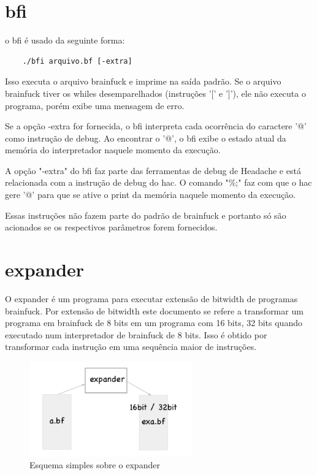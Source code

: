 \section{bfi}

o bfi é usado da seguinte forma:

\begin{verbatim}
    ./bfi arquivo.bf [-extra]
\end{verbatim}

Isso executa o arquivo brainfuck e imprime na saída padrão. Se o arquivo brainfuck tiver os whiles desemparelhados (instruções '[' e ']'), ele não executa o programa, porém exibe uma mensagem de erro. 

Se a opção -extra for fornecida, o bfi interpreta cada ocorrência do caractere '@' como instrução de debug. Ao encontrar o '@', o bfi exibe o estado atual da memória do interpretador naquele momento da execução. 

A opção "-extra" do bfi faz parte das ferramentas de debug de Headache e está relacionada com a instrução de debug do hac. O comando "\%;"  faz com que o hac gere '@' para que se ative o print da memória naquele momento da execução.

Essas instruções não fazem parte do padrão de brainfuck e portanto só são acionados se os respectivos parâmetros forem fornecidos.

\section{expander}

O expander é um programa para executar extensão de bitwidth de programas brainfuck. Por extensão de bitwidth este documento se refere a transformar um programa em brainfuck de 8 bits em um programa com 16 bits, 32 bits quando executado num interpretador de brainfuck de 8 bits. Isso é obtido por transformar cada instrução em uma sequência maior de instruções. 

\begin{figure}[h]
    \centering
	\includegraphics[width = 7cm]{TD/img/expander.png}
	\caption{Esquema simples sobre o expander}
	\label{expander}
\end{figure}

